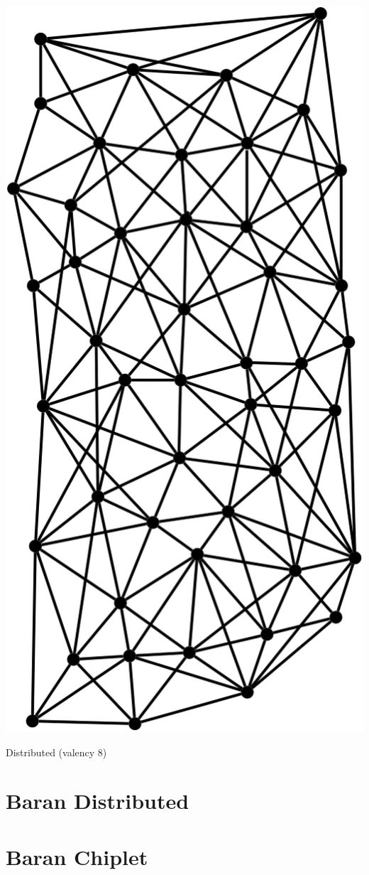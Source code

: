 \begin{marginfigure}
  \includegraphics[width=0.6\linewidth]{../Figures/Baran-valency-8.png}
  \caption{Distributed (valency 8)}
\end{marginfigure}

  
\section{Baran Distributed}

\section{Baran Chiplet}

